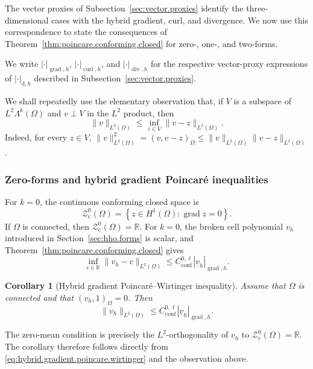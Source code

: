 \documentclass[a4paper,11pt]{article}
\newtheorem{corollary}[theorem]{Corollary}
\theoremstyle{definition}
\newcommand{\DIFF}{\mathrm{d}}
\begin{document}
The vector proxies of Subsection~\ref{sec:vector.proxies} identify the three-dimensional cases with the hybrid gradient, curl, and divergence.
We now use this correspondence to state the consequences of Theorem~\ref{thm:poincare.conforming.closed} for zero-, one-, and two-forms.

We write $|\cdot|_{\operatorname{grad},h}$, $|\cdot|_{\operatorname{curl},h}$, and $|\cdot|_{\operatorname{div},h}$ for the respective vector-proxy expressions of $|\cdot|_{\DIFF,h}$ described in Subsection~\ref{sec:vector.proxies}.

We shall repeatedly use the elementary observation that, if $V$ is a subspace of $L^2\Lambda^k(\Omega)$ and $v\perp V$ in the $L^2$ product, then
\[
  \|v\|_{L^2(\Omega)}
  \leq
  \inf_{z\in V}
  \|v-z\|_{L^2(\Omega)}.
\]
Indeed, for every $z\in V$, $\|v\|_{L^2(\Omega)}^2=(v,v-z)_\Omega \leq \|v\|_{L^2(\Omega)}\|v-z\|_{L^2(\Omega)}$.

\subsubsection{Zero-forms and hybrid gradient Poincar\'e inequalities}
\label{subsec:poincare.proxy.gradient}

For $k=0$, the continuous conforming closed space is
\[
  \mathcal Z_{\mathrm c}^0(\Omega)
  =
  \left\{
    z\in H^1(\Omega):
    \operatorname{grad}z=0
  \right\}.
\]
If $\Omega$ is connected, then $\mathcal Z_{\mathrm c}^0(\Omega)=\mathbb R$.
For $k=0$, the broken cell polynomial $v_h$ introduced in Section~\ref{sec:hho.forms} is scalar, and Theorem~\ref{thm:poincare.conforming.closed} gives
\begin{equation}
\label{eq:hybrid.gradient.poincare.wirtinger}
  \inf_{c\in\mathbb R}
  \|v_h-c\|_{L^2(\Omega)}
  \leq
  C_{\mathrm{conf}}^{0,\ell}
  |\underline v_h|_{\operatorname{grad},h}.
\end{equation}

\begin{corollary}[Hybrid gradient Poincar\'e--Wirtinger inequality]
\label{cor:hybrid.gradient.poincare.wirtinger}
Assume that $\Omega$ is connected and that $(v_h,1)_\Omega=0$.
Then
\[
  \|v_h\|_{L^2(\Omega)}
  \leq
  C_{\mathrm{conf}}^{0,\ell}
  |\underline v_h|_{\operatorname{grad},h}.
\]
\end{corollary}

The zero-mean condition is precisely the $L^2$-orthogonality of $v_h$ to $\mathcal Z_{\mathrm c}^0(\Omega)=\mathbb R$.
The corollary therefore follows directly from \eqref{eq:hybrid.gradient.poincare.wirtinger} and the observation above.
\end{document}
